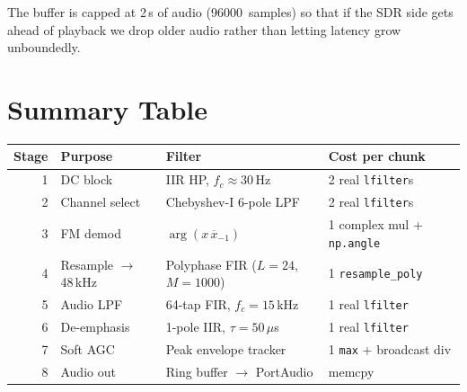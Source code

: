 \documentclass[11pt,a4paper]{article}
\begin{document}
\begin{center}
\end{center}

The buffer is capped at 2\,s of audio (\SI{96000}{samples}) so that if
the SDR side gets ahead of playback we drop older audio rather than
letting latency grow unboundedly.

\section{Summary Table}

\begin{center}
\begin{tabular}{@{}rlll@{}}
\toprule
\textbf{Stage} & \textbf{Purpose} & \textbf{Filter}   & \textbf{Cost per chunk} \\
\midrule
1 & DC block         & IIR HP, $f_c{\approx}30$\,Hz          & 2 real \texttt{lfilter}s \\
2 & Channel select   & Chebyshev-I 6-pole LPF                & 2 real \texttt{lfilter}s \\
3 & FM demod         & $\arg(x\,\overline{x}_{-1})$          & 1 complex mul + \texttt{np.angle} \\
4 & Resample $\to$ 48\,kHz & Polyphase FIR ($L{=}24$, $M{=}1000$) & 1 \texttt{resample\_poly} \\
5 & Audio LPF        & 64-tap FIR, $f_c{=}15$\,kHz           & 1 real \texttt{lfilter} \\
6 & De-emphasis      & 1-pole IIR, $\tau{=}50\,\mu$s         & 1 real \texttt{lfilter} \\
7 & Soft AGC         & Peak envelope tracker                 & 1 \texttt{max} + broadcast div \\
8 & Audio out        & Ring buffer $\to$ PortAudio           & memcpy \\
\bottomrule
\end{tabular}
\end{center}
\end{document}
